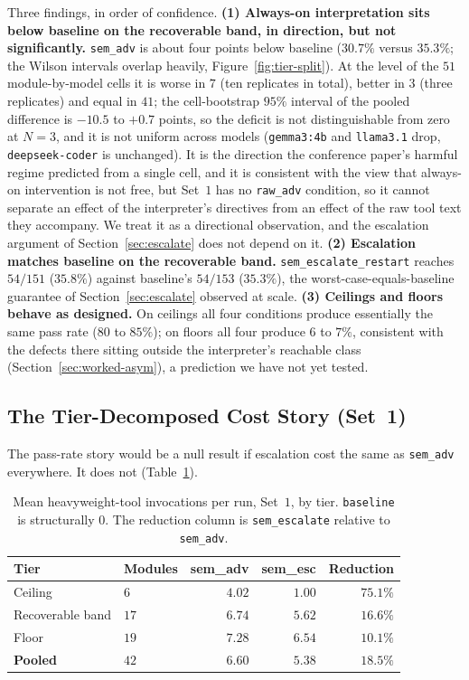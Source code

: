 \documentclass[11pt]{article}
\begin{document}
Three findings, in order of confidence. \textbf{(1) Always-on interpretation
sits below baseline on the recoverable band, in direction, but not
significantly.} \texttt{sem\_adv} is about four points below baseline
($30.7\%$ versus $35.3\%$; the Wilson intervals overlap heavily,
Figure~\ref{fig:tier-split}). At the level of the $51$ module-by-model cells it
is worse in $7$ (ten replicates in total), better in $3$ (three replicates) and
equal in $41$; the cell-bootstrap $95\%$ interval of the pooled difference is
$-10.5$ to $+0.7$ points, so the deficit is not distinguishable from zero at
$N{=}3$, and it is not uniform across models (\texttt{gemma3:4b} and
\texttt{llama3.1} drop, \texttt{deepseek-coder} is unchanged). It is the
direction the conference paper's harmful regime predicted from a single cell,
and it is consistent with the view that always-on intervention is not free,
but Set~$1$ has no \texttt{raw\_adv} condition, so it cannot separate an
effect of the interpreter's directives from an effect of the raw tool text
they accompany. We treat it as a directional observation, and the escalation
argument of Section~\ref{sec:escalate} does not depend on it.
\textbf{(2) Escalation matches baseline on the recoverable band.}
\texttt{sem\_escalate\_restart} reaches $54/151$ ($35.8\%$) against baseline's
$54/153$ ($35.3\%$), the worst-case-equals-baseline guarantee of
Section~\ref{sec:escalate} observed at scale. \textbf{(3) Ceilings and floors
behave as designed.} On ceilings all four conditions produce essentially the
same pass rate ($80$ to $85\%$); on floors all four produce $6$ to $7\%$,
consistent with the defects there sitting outside the interpreter's reachable
class (Section~\ref{sec:worked-asym}), a prediction we have not yet tested.

\subsection{The Tier-Decomposed Cost Story (Set~1)}
\label{sec:stitch-rtllm-cost}

The pass-rate story would be a null result if escalation cost the same as
\texttt{sem\_adv} everywhere. It does not (Table~\ref{tab:tier-cost}).

\begin{table}[htbp]
\centering
\caption{Mean heavyweight-tool invocations per run, Set~$1$, by tier.
\texttt{baseline} is structurally $0$. The reduction column is
\texttt{sem\_escalate} relative to \texttt{sem\_adv}.}
\label{tab:tier-cost}
\small
\begin{tabularx}{\linewidth}{@{} l X r r r @{}}
\toprule
\textbf{Tier} & \textbf{Modules} & \textbf{sem\_adv} & \textbf{sem\_esc} & \textbf{Reduction} \\
\midrule
Ceiling            & $6$  & $4.02$ & $1.00$ & $\mathbf{75.1\%}$ \\
Recoverable band   & $17$ & $6.74$ & $5.62$ & $16.6\%$ \\
Floor              & $19$ & $7.28$ & $6.54$ & $10.1\%$ \\
\midrule
\textbf{Pooled}    & $42$ & $6.60$ & $5.38$ & $18.5\%$ \\
\bottomrule
\end{tabularx}
\end{table}
\end{document}
